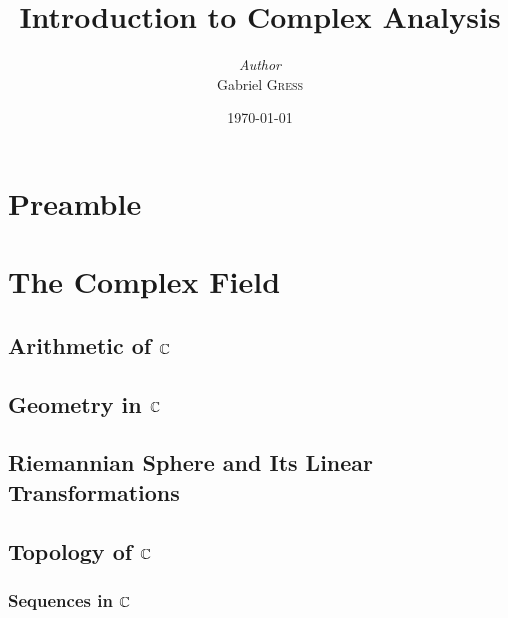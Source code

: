 \documentclass[oneside]{memoir}
\institute{Rice University}
\title{Introduction to Complex Analysis}
\author{\textit{Author}\\Gabriel \textsc{Gress}}
\date{\today}
\begin{document}
\maketitle

\tableofcontents

\setcounter{chapter}{-1}

\chapter{Preamble}
\label{cha:preamble}



\chapter{The Complex Field}
\label{cha:the_complex_field}

\section{Arithmetic of \(\mathbb{C}\)}
\label{sec:arithmetic_and_geometry_of_c}



\section{Geometry in \(\mathbb{C}\)}
\label{sec:geometry_in_c}



\section{Riemannian Sphere and Its Linear Transformations}
\label{sec:riemannian_sphere_and_its_linear_transformations}



\section{Topology of \(\mathbb{C}\)}
\label{sec:topology_of_c}



\subsection{Sequences in \(\mathbb{C}\)}
\label{sub:sequences_in_c}


\end{document}
